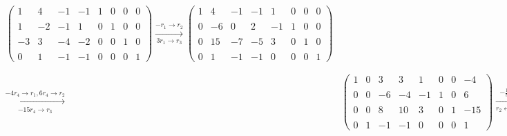 \documentclass{article}
\begin{document}
\begin{enumerate}
\begin{enumerate}
\begin{align*}
\begin{pmatrix}
                1 &  4 & -1 & -1 & 1 & 0 & 0 & 0\\ \\
                1 & -2 & -1 &  1 & 0 & 1 & 0 & 0\\ \\
                -3&  3 & -4 & -2 & 0 & 0 & 1 & 0\\ \\
                0 &  1 & -1 & -1 & 0 & 0 & 0 & 1
            \end{pmatrix}
            \xrightarrow[3r_1 \to r_3]{-r_1 \to r_2}
            \begin{pmatrix}
                1 &  4 & -1 & -1 & 1 & 0 & 0 & 0\\ \\
                0 & -6 &  0 &  2 & -1& 1 & 0 & 0\\ \\
                0 & 15 & -7 & -5 & 3 & 0 & 1 & 0\\ \\
                0 &  1 & -1 & -1 & 0 & 0 & 0 & 1
            \end{pmatrix}\\ & \\
            \xrightarrow[-15r_4 \to r_3]{-4r_4 \to r_1,6r_4 \to r_2}
            &\begin{pmatrix}
                1 & 0 &  3 &  3 & 1 & 0 & 0 & -4\\ \\
                0 & 0 & -6 & -4 & -1& 1 & 0 &  6\\ \\
                0 & 0 &  8 & 10 & 3 & 0 & 1 & -15\\ \\
                0 & 1 & -1 & -1 & 0 & 0 & 0 & 1
            \end{pmatrix}
            \xrightarrow[r_2 \leftrightarrow r_4]{-\frac{1}{8}r_3}
            \begin{pmatrix}
                1 & 0 &  3 &  3 & 1 & 0 & 0 & -4\\ \\
                0 & 1 & -1 & -1 & 0 & 0 & 0 & 1\\ \\
                0 & 0 &  1 & \displaystyle{\frac{5}{4}} & \displaystyle{\frac{3}{8}} & 0 & \displaystyle{\frac{1}{8}} & \displaystyle{-\frac{15}{8}}\\ \\
                0 & 0 & -6 & -4 & -1& 1 & 0 &  6
            \end{pmatrix}

\end{align*}
\end{enumerate}
\end{enumerate}
\end{document}
